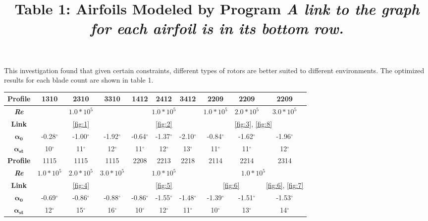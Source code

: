 \documentclass{article}
\begin{document}
This investigation found that given certain constraints, different types of rotors are better suited to different environments. The optimized results for each blade count are shown in table 1. 
\begin{table}[bp]
	\centering
	\title{Table 1: Airfoils Modeled by Program \newline}
	\title{\emph{A link to the graph for each airfoil is in its bottom row.}} \label{table:1}
	\begin{tabular}{ | c | c | c | c | c | c | c | c | c | c |}
		\hline
		 \textbf{Profile} & 1310 & 2310 & 3310 & 1412 & 2412 & 3412 & 2209 & 2209 & 2209 \\ \hline
		 \textbf{\emph{Re}} & \multicolumn{3}{c|}{$1.0*10^5$}  & \multicolumn{3}{c|}{$1.0*10^5$} & $1.0*10^5$ & $2.0*10^5$ & $3.0*10^5$ \\ \hline
		 \textbf{Link} & \multicolumn{3}{c|}{\ref{fig:1}} & \multicolumn{3}{c|}{\ref{fig:2}} & \multicolumn{3}{c|}{\ref{fig:3}, \ref{fig:8}}\\ \hline 
		 $\mathbf{\alpha_{0}}$ & -0.28$^{\circ}$ & -1.00$^{\circ}$ & -1.92$^{\circ}$ & -0.64$^{\circ}$ & -1.37$^{\circ}$ & -2.10$^{\circ}$ & -0.84$^{\circ}$ & -1.62$^{\circ}$ & -1.96$^{\circ}$ \\ \hline
		 $\mathbf{\alpha_{st}}$ & 10$^{\circ}$ & 11$^{\circ}$ & 12$^{\circ}$ & 11$^{\circ}$ & 12$^{\circ}$ & 13$^{\circ}$ & 11$^{\circ}$ & 11$^{\circ}$ & 12$^{\circ}$ \\ \hline \hline
		 \newline
		 \textbf{Profile} & 1115 & 1115 & 1115 & 2208 & 2213 & 2218 & 2114 & 2214 & 2314 \\ \hline
		 \textbf{\emph{Re}} & $1.0*10^5$ & $2.0*10^5$ & $3.0*10^5$ & \multicolumn{3}{c|}{$1.0*10^5$} & \multicolumn{3}{c|}{$1.0*10^5$} \\ \hline
		 \textbf{Link} & \multicolumn{3}{c|}{\ref{fig:4}}& \multicolumn{3}{c|}{\ref{fig:5}} & \multicolumn{2}{c|}{\ref{fig:6}} & \ref{fig:6}, \ref{fig:7} \\ \hline
		 $\mathbf{\alpha_{0}}$ & -0.69$^{\circ}$ & -0.86$^{\circ}$ & -0.88$^{\circ}$ & -0.86$^{\circ}$ & -1.55$^{\circ}$ & -1.48$^{\circ}$ & -1.39$^{\circ}$ & -1.51$^{\circ}$ & -1.53$^{\circ}$ \\ \hline
		 $\mathbf{\alpha_{st}}$ & 12$^{\circ}$ & 15$^{\circ}$ & 16$^{\circ}$ & 10$^{\circ}$ & 12$^{\circ}$ & 11$^{\circ}$ & 10$^{\circ}$ & 13$^{\circ}$ & 14$^{\circ}$ \\ \hline
	\end{tabular}
\end{table}
\end{document}
